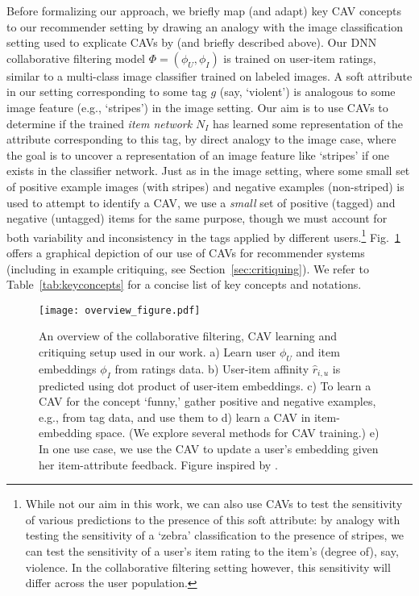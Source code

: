\documentclass[manuscript,screen,nonacm]{acmart}
\newcommand{\1}{{\mathbf 1}}
\newcommand{\hatr}{\hat{r}}
\theoremstyle{TheoremNum}
\begin{document}
Before formalizing our approach, we briefly map (and adapt) key CAV concepts to our recommender setting by drawing an analogy with the image classification setting used to explicate CAVs by \citet{kimTCAV:icml18} (and briefly described above). Our DNN collaborative filtering model $\Phi = (\phi_U, \phi_I)$ is trained on user-item ratings, similar to a multi-class image classifier trained on labeled images. A soft attribute in our setting corresponding to some tag $g$ (say, `violent') is analogous to some image feature (e.g., `stripes') in the image setting. Our aim is to use CAVs to determine if the trained \emph{item network} $N_I$ has learned some representation of the attribute corresponding to this tag, by direct analogy to the image case, where the goal is to uncover a representation of an image feature like `stripes' if one exists in the classifier network. Just as in the image setting, where some small set of positive example images (with stripes) and negative examples (non-striped) is used to attempt to identify a CAV, we use a \emph{small} set of positive (tagged) and negative (untagged) items for the same purpose, though we must account for both variability and inconsistency in the tags applied by different users.\footnote{While not our aim in this work, we can also use CAVs to test the sensitivity of various predictions to the presence of this soft attribute: by analogy with testing the sensitivity of a `zebra' classification to the presence of stripes, we can test the sensitivity of a user's item rating to the item's (degree of), say, violence. In the collaborative filtering setting however, this sensitivity will differ across the user population.}
Fig.~\ref{fig:overview} offers a graphical depiction of our use of CAVs for recommender systems (including in example critiquing, see Section~\ref{sec:critiquing}).
We refer to 
Table~\ref{tab:keyconcepts} for a concise list of key concepts and notations.

\begin{figure}
    \centering
\texttt{[image: overview\_figure.pdf]}
  \vspace{-0.1in}
\caption{An overview of the collaborative filtering, CAV learning and critiquing setup used in our work. a) Learn user $\phi_U$ and item embeddings $\phi_I$ from ratings data. b) User-item affinity $\hatr_{i,u}$ is predicted using dot product of user-item embeddings. c) To learn a CAV for the concept `funny,' gather positive and negative examples, e.g., from tag data, and use them to d) learn a CAV in item-embedding space. (We explore several methods for CAV training.) e) In one use case, we use the CAV to update a user's embedding given her item-attribute feedback. Figure inspired by \cite{kimTCAV:icml18}.}
  \vspace{-0.1in}
\label{fig:overview}
\end{figure}
\end{document}
